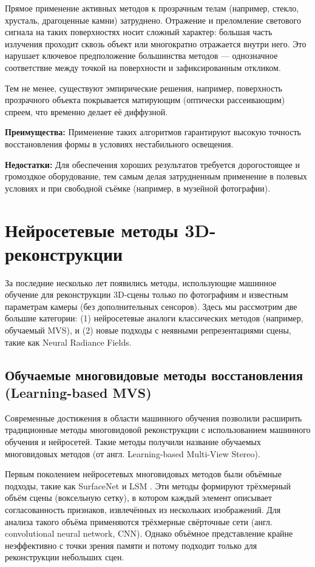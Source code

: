 Прямое применение активных методов к прозрачным телам (например, стекло,
хрусталь, драгоценные камни) затруднено. Отражение и преломление светового
сигнала на таких поверхностях носит сложный характер: большая часть излучения
проходит сквозь объект или многократно отражается внутри него. Это нарушает
ключевое предположение большинства методов — однозначное соответствие между
точкой на поверхности и зафиксированным откликом.

Тем не менее, существуют эмпирические решения, например, поверхность прозрачного
объекта покрывается матирующим (оптически рассеивающим) спреем, что временно делает
её диффузной.

\textbf{Преимущества:} Применение таких алгоритмов гарантируют высокую точность
восстановления формы в условиях нестабильного освещения.

\textbf{Недостатки:} Для обеспечения хороших результатов требуется дорогостоящее
и громоздкое оборудование, тем самым делая затрудненным применение в полевых
условиях и при свободной съёмке (например, в музейной фотографии).

\section{Нейросетевые методы 3D-реконструкции}

За последние несколько лет появились методы, использующие машинное обучение для
реконструкции 3D-сцены только по фотографиям и известным параметрам камеры (без
дополнительных сенсоров). Здесь мы рассмотрим две большие категории: (1)
нейросетевые аналоги классических методов (например, обучаемый MVS), и (2) новые
подходы с неявными репрезентациями сцены, такие как Neural Radiance
Fields.

\subsection{Обучаемые многовидовые методы восстановления (Learning-based MVS)}

Современные достижения в области машинного обучения позволили расширить
традиционные методы многовидовой реконструкции с использованием машинного
обучения и нейросетей. Такие методы получили название обучаемых многовидовых
методов (от англ. Learning-based Multi-View Stereo).

Первым поколением нейросетевых многовидовых методов были объёмные подходы, такие
как SurfaceNet \cite{ji2017surfacenet} и LSM
\cite{kar2017learningmultiviewstereomachine}. Эти методы формируют трёхмерный
объём сцены (воксельную сетку), в котором каждый элемент описывает
согласованность признаков, извлечённых из нескольких изображений. Для анализа
такого объёма применяются трёхмерные свёрточные сети (англ. convolutional neural
network, CNN). Однако объёмное представление крайне неэффективно с точки зрения
памяти и потому подходит только для реконструкции небольших сцен.

